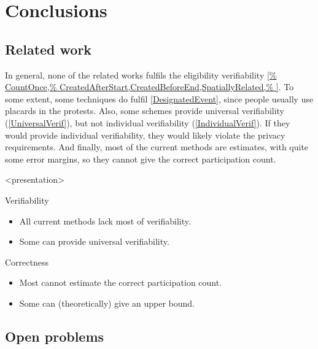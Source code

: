 \mode*
\section{Conclusions}

\subsection<presentation>{Related work}

In general, none of the related works fulfils the eligibility verifiability 
\cref{%
  CountOnce,%
  CreatedAfterStart,CreatedBeforeEnd,SpatiallyRelated,%
}.
To some extent, some techniques do fulfil \cref{DesignatedEvent}, since people 
usually use placards in the protests.
Also, some schemes provide universal verifiability (\cref{UniversalVerif}), but 
not individual verifiability (\cref{IndividualVerif}).
If they would provide individual verifiability, they would likely violate the 
privacy requirements.
And finally, most of the current methods are estimates, with quite some error 
margins, so they cannot give the correct participation count.

\begin{frame}<presentation>
  \begin{block}{Verifiability}
    \begin{itemize}
      \item All current methods lack most of verifiability.
      \item Some can provide universal verifiability.
    \end{itemize}
  \end{block}

  \pause{}

  \begin{block}{Correctness}
    \begin{itemize}
      \item Most cannot estimate the correct participation count.
      \item Some can (theoretically) give an upper bound.
    \end{itemize}
  \end{block}
\end{frame}

\subsection{Open problems}

